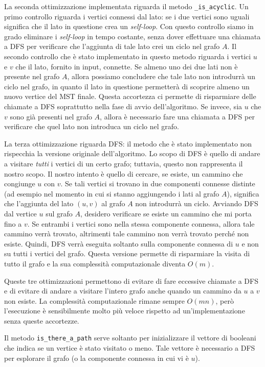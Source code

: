 La seconda ottimizzazione implementata riguarda il metodo
\verb|_is_acyclic|. Un primo controllo riguarda i vertici
connessi dal lato: se i due vertici sono uguali significa
che il lato in questione crea un \textit{self-loop}. Con
questo controllo siamo in grado eliminare i \textit{self-loop} in
tempo costante, senza dover effettuare una chiamata a DFS per verificare
che l'aggiunta di tale lato crei un ciclo nel grafo $A$.
Il secondo controllo che è stato implementato in questo metodo
riguarda i vertici $u$ e $v$ che il lato, fornito in input, connette.
Se almeno uno dei due lati non è presente nel grafo $A$, allora
possiamo concludere che tale lato non introdurrà un ciclo nel grafo,
in quanto il lato in questione permetterà di scoprire almeno un nuovo
vertice del MST finale. Questa accortezza ci permette di risparmiare
delle chiamate a DFS soprattutto nella fase di avvio
dell'algoritmo. Se invece, sia $u$ che $v$ sono già presenti
nel grafo $A$, allora è necessario fare una chiamata a DFS per verificare
che quel lato non introduca un ciclo nel grafo.

La terza ottimizzazione riguarda DFS: il metodo che è stato implementato
non rispecchia la versione originale dell'algoritmo. Lo scopo di DFS
è quello di andare a visitare \textit{tutti} i vertici di un certo
grafo; tuttavia, questo non rappresenta il nostro scopo. Il nostro
intento è quello di cercare, se esiste, un cammino che congiunge $u$ con
$v$. Se tali vertici si trovano in due componenti connesse distinte
(ad esempio nel momento in cui si stanno aggiungendo i lati al
grafo $A$), significa che l'aggiunta del lato $(u, v)$ al grafo $A$ non
introdurrà un ciclo. Avviando DFS dal vertice $u$ sul grafo $A$,
desidero verificare se esiste un cammino che mi porta fino a $v$.
Se entrambi i vertici sono nella stessa componente connessa, allora
tale cammino verrà trovato, altrimenti tale cammino non verrà
trovato perché non esiste. Quindi, DFS verrà eseguita soltanto sulla
componente connessa di $u$ e non su tutti i vertici del grafo.
Questa versione permette di risparmiare la visita di tutto il grafo
e la sua complessità computazionale diventa $O(m)$.

Queste tre ottimizzazioni permettono di evitare di fare eccessive
chiamate a DFS e di evitare di andare a visitare l'intero grafo
anche quando un cammino da $u$ a $v$ non esiste. La complessità
computazionale rimane sempre $O(mn)$, però l'esecuzione è sensibilmente
molto più veloce rispetto ad un'implementazione senza queste accortezze.

Il metodo \verb|is_there_a_path| serve soltanto per inizializzare
il vettore di booleani che indica se un vertice è stato visitato o meno.
Tale vettore è necessario a DFS per esplorare il grafo (o la
componente connessa in cui vi è $u$).

